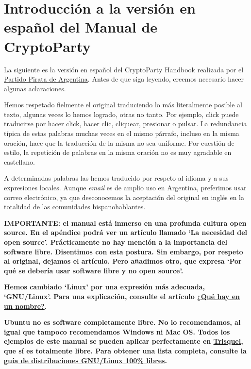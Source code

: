 \documentclass[10pt,a5paper,twoside,,]{book}
\date{}
\begin{document}
{
\setcounter{tocdepth}{2}
\tableofcontents
}
\chapter{Introducción a la versión en español del Manual de
CryptoParty}\label{introducciuxf3n-a-la-versiuxf3n-en-espauxf1ol-del-manual-de-cryptoparty}

La siguiente es la versión en español del CryptoParty Handbook realizada
por el \href{http://www.partidopirata.com.ar}{Partido Pirata de
Argentina}. Antes de que siga leyendo, creemos necesario hacer algunas
aclaraciones.

Hemos respetado fielmente el original traduciendo lo más literalmente
posible al texto, algunas veces lo hemos logrado, otras no tanto. Por
ejemplo, click puede traducirse por hacer click, hacer clic, cliquear,
presionar o pulsar. La redundancia típica de estas palabras muchas veces
en el mismo párrafo, incluso en la misma oración, hace que la traducción
de la misma no sea uniforme. Por cuestión de estilo, la repetición de
palabras en la misma oración no es muy agradable en castellano.

A determinadas palabras las hemos traducido por respeto al idioma y a
sus expresiones locales. Aunque \emph{email} es de amplio uso en
Argentina, preferimos usar correo electrónico, ya que desconocemos la
aceptación del original en inglés en la totalidad de las comunidades
hispanohablantes.

\textbf{IMPORTANTE: el manual está inmerso en una profunda cultura open
source. En el apéndice podrá ver un artículo llamado `La necesidad del
open source'. Prácticamente no hay mención a la importancia del software
libre. Disentimos con esta postura. Sin embargo, por respeto al
original, dejamos el artículo. Pero añadimos otro, que expresa `Por qué
se debería usar software libre y no open source'.}

\textbf{Hemos cambiado `Linux' por una expresión más adecuada,
`GNU/Linux'. Para una explicación, consulte el artículo
\href{https://www.gnu.org/gnu/why-gnu-linux.es.html}{¿Qué hay en un
nombre?}.}

\textbf{Ubuntu no es software completamente libre. No lo recomendamos,
al igual que tampoco recomendamos Windows ni Mac OS. Todos los ejemplos
de este manual se pueden aplicar perfectamente en
\href{https://trisquel.info/es}{Trisquel}, que sí es totalmente libre.
Para obtener una lista completa, consulte la
\href{https://www.gnu.org/distros/free-distros.es.html}{guía de
distribuciones GNU/Linux 100\% libres}.}
\end{document}
